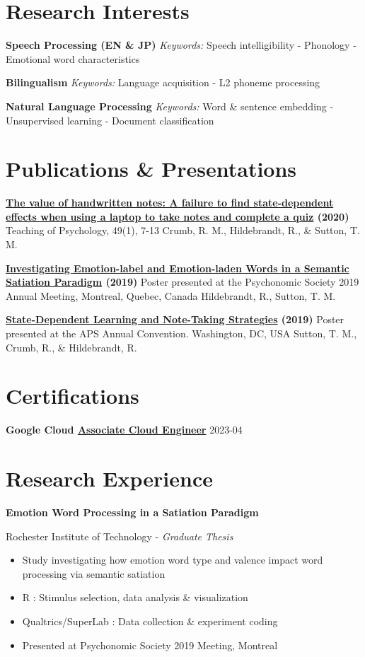 \documentclass[a4paper,9pt]{extarticle}
\begin{document}
\section*{Research Interests}
\noindent\textbf{Speech Processing (EN \& JP)}
\textit{Keywords:} Speech intelligibility - Phonology - Emotional word characteristics

\noindent\textbf{Bilingualism}
\textit{Keywords:} Language acquisition - L2 phoneme processing

\noindent\textbf{Natural Language Processing}
\textit{Keywords:} Word \& sentence embedding - Unsupervised learning - Document classification

\section*{Publications \& Presentations}
\noindent\textbf{\href{http://dx.doi.org/10.1177/0098628320979895}{The value of handwritten notes: A failure to find state-dependent effects when using a laptop to take notes and complete a quiz} (2020)}
Teaching of Psychology, 49(1), 7-13
Crumb, R. M., Hildebrandt, R., \& Sutton, T. M.

\noindent\textbf{\href{}{Investigating Emotion-label and Emotion-laden Words in a Semantic Satiation Paradigm} (2019)}
Poster presented at the Psychonomic Society 2019 Annual Meeting, Montreal, Quebec, Canada
Hildebrandt, R., Sutton, T. M.

\noindent\textbf{\href{}{State-Dependent Learning and Note-Taking Strategies} (2019)}
Poster presented at the APS Annual Convention. Washington, DC, USA
Sutton, T. M., Crumb, R., \& Hildebrandt, R.

\section*{Certifications}
\noindent\textbf{Google Cloud \href{https://google.accredible.com/d3ef369f-9c2c-486a-bda6-943a74f70dff}{Associate Cloud Engineer}}
\hfill2023-04

\section*{Research Experience}
\noindent\textbf{Emotion Word Processing in a Satiation Paradigm}

Rochester Institute of Technology - \textit{Graduate Thesis}
\begin{itemize}
\item Study investigating how emotion word type and valence impact word processing via semantic satiation
\item R : Stimulus selection, data analysis \& visualization
\item Qualtrics/SuperLab : Data collection \& experiment coding
\item Presented at Psychonomic Society 2019 Meeting, Montreal
\end{itemize}
\end{document}
